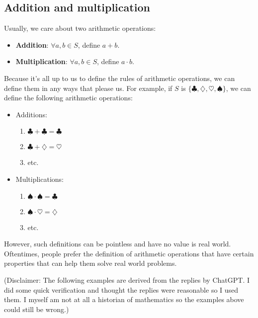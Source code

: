 \documentclass[12pt, letterpaper, oneside]{book}
\begin{document}
\subsection{Addition and multiplication}

Usually, we care about two arithmetic operations:

\begin{itemize}
  \item \textbf{Addition}: $\forall a, b \in S$, define $a + b$.
  \item \textbf{Multiplication}: $\forall a, b \in S$, define $a \cdot b$.
\end{itemize}

Because it's all up to us to define the rules of arithmetic operations, we can
define them in any ways that please us. For example, if $S$ is $\{ \clubsuit,
\diamondsuit, \heartsuit, \spadesuit \}$, we can define the following
arithmetic operations:

\begin{itemize}
  \item Additions:
    \begin{enumerate}
      \item $\clubsuit + \clubsuit = \clubsuit$
      \item $\clubsuit + \diamondsuit = \heartsuit$
      \item etc.
    \end{enumerate}
  \item Multiplications:
    \begin{enumerate}
      \item $\spadesuit \cdot \spadesuit = \clubsuit$
      \item $\spadesuit \cdot \heartsuit = \diamondsuit$
      \item etc.
    \end{enumerate}
\end{itemize}

However, such definitions can be pointless and have no value is real world.
Oftentimes, people prefer the definition of arithmetic operations that have
certain properties that can help them solve real world problems.

(Disclaimer: The following examples are derived from the replies by ChatGPT. I
did some quick verification and thought the replies were reasonable so I used
them. I myself am not at all a historian of mathematics so the examples above
could still be wrong.)
\end{document}
